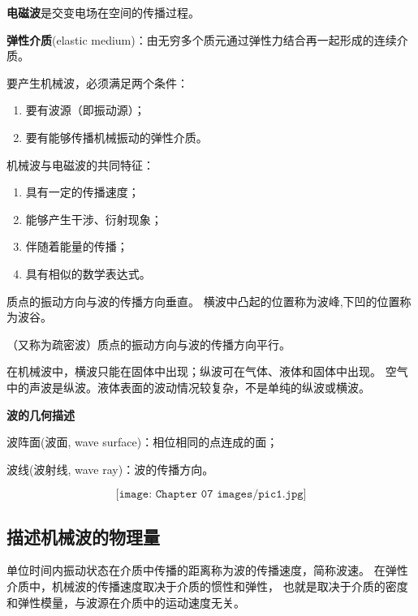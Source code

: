 \documentclass[
	12pt, %
	a4paper, %
]{myLegrandOrangeBook}
\begin{document}
    \textbf{电磁波}是交变电场在空间的传播过程。

    \textbf{弹性介质}(elastic medium)：由无穷多个质元通过弹性力结合再一起形成的连续介质。

    \vspace{1em}
    要产生机械波，必须满足两个条件：

    \begin{enumerate}
        \item 要有波源（即振动源）；
        \item 要有能够传播机械振动的弹性介质。
    \end{enumerate}

    \vspace{1em}
    机械波与电磁波的共同特征：

    \begin{enumerate}
        \item 具有一定的传播速度；
        \item 能够产生干涉、衍射现象；
        \item 伴随着能量的传播；
        \item 具有相似的数学表达式。
    \end{enumerate}

\begin{definition}[横波]
    质点的振动方向与波的传播方向垂直。
    横波中凸起的位置称为波峰,下凹的位置称为波谷。
\end{definition}

\begin{definition}[纵波]
    （又称为疏密波）质点的振动方向与波的传播方向平行。
\end{definition}

    在机械波中，横波只能在固体中出现；纵波可在气体、液体和固体中出现。
    空气中的声波是纵波。液体表面的波动情况较复杂，不是单纯的纵波或横波。

\textbf{波的几何描述}

    波阵面(波面, wave surface)：相位相同的点连成的面；

    波线(波射线, wave ray)：波的传播方向。

    \[
        \texttt{[image: Chapter 07 images/pic1.jpg]}
    \]

\subsection{描述机械波的物理量}

\begin{definition}[波速]
    单位时间内振动状态在介质中传播的距离称为波的传播速度，简称波速。
    在弹性介质中，机械波的传播速度取决于介质的惯性和弹性，
    也就是取决于介质的密度和弹性模量，与波源在介质中的运动速度无关。
\end{definition}
\end{document}
